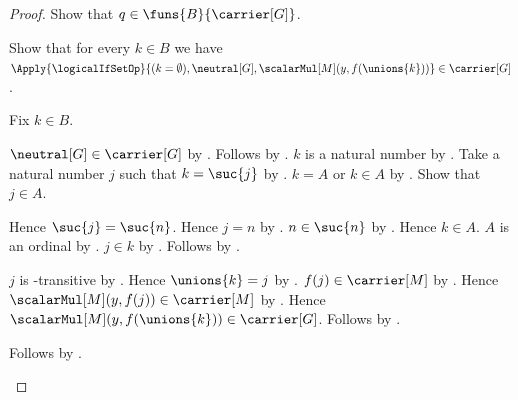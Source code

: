 \begin{proof}
    Show that $q\in\funs{B}{\carrier[G]}$.
    \begin{subproof}
        Show that for every $k\in B$ we have
            $\Apply{\logicalIfSetOp}{
                (k=\emptyset),\neutral[G],
                \scalarMul[M](y,f(\unions{k}))}
                \in\carrier[G]$.
        \begin{subproof}
            Fix $k\in B$.
            \begin{byCase}
                    $\neutral[G]\in\carrier[G]$ by
                        .
                    Follows by .
                    $k$ is a natural number by
                        .
                    Take a natural number $j$ such that $k=\suc{j}$ by
                        .
                    $k=A$ or $k\in A$ by
                        .
                    Show that $j\in A$.
                    \begin{subproof}
                        \begin{byCase}
                                Hence $\suc{j}=\suc{n}$.
                                Hence $j=n$ by .
                                $n\in\suc{n}$ by
                                    .
                                Hence $k\in A$.
                                $A$ is an ordinal by
                                    .
                                $j\in k$ by .
                                Follows by
                                    .
                        \end{byCase}
                    \end{subproof}
                    $j$ is \in-transitive by
                        .
                    Hence $\unions{k}=j$ by
                        .
                    $f(j)\in\carrier[M]$ by
                        .
                    Hence $\scalarMul[M](y,f(j))\in\carrier[M]$ by
                        .
                    Hence $\scalarMul[M](y,f(\unions{k}))
                        \in\carrier[G]$.
                    Follows by .
            \end{byCase}
        \end{subproof}
        Follows by .
    \end{subproof}


\end{proof}
